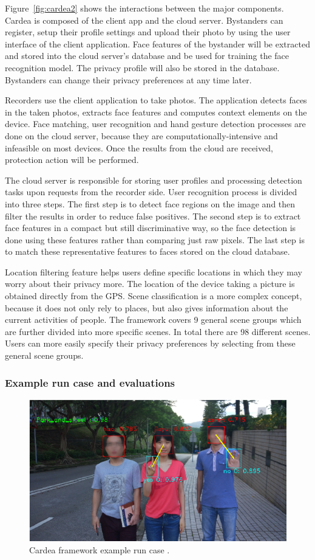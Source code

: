 \documentclass[conference]{IEEEtran}
\begin{document}
Figure~\ref{fig:cardea2} shows the interactions between the major components. Cardea is composed of the client app and the cloud server. Bystanders can register, setup their profile settings and upload their photo by using the user interface of the client application. Face features of the bystander will be extracted and stored into the cloud server's database and be used for training the face recognition model. The privacy profile will also be stored in the database. Bystanders can change their privacy preferences at any time later. 

Recorders use the client application to take photos. The application detects faces in the taken photos, extracts face features and computes context elements on the device. Face matching, user recognition and hand gesture detection processes are done on the cloud server, because they are computationally-intensive and infeasible on most devices. Once the results from the cloud are received, protection action will be performed. 

The cloud server is responsible for storing user profiles and processing detection tasks upon requests from the recorder side. User recognition process is divided into three steps. The first step is to detect face regions on the image and then filter the results in order to reduce false positives. The second step is to extract face features in a compact but still discriminative way, so the face detection is done using these features rather than comparing just raw pixels. The last step is to match these representative features to faces stored on the cloud database. 

Location filtering feature helps users define specific locations in which they may worry about their privacy more. The location of the device taking a picture is obtained directly from the \ac{GPS}. Scene classification is a more complex concept, because it does not only rely to places, but also gives information about the current activities of people. The framework covers 9 general scene groups which are further divided into more specific scenes. In total there are 98 different scenes. Users can more easily specify their privacy preferences by selecting from these general scene groups. 


\subsubsection{Example run case and evaluations}
\begin{figure}[t]
\centerline{\includegraphics[width=.5\textwidth]{img/cardea_example.png}}
\caption{Cardea framework example run case \cite{shu2016cardea}.}
\label{fig:cardea3}
\end{figure}
\end{document}
